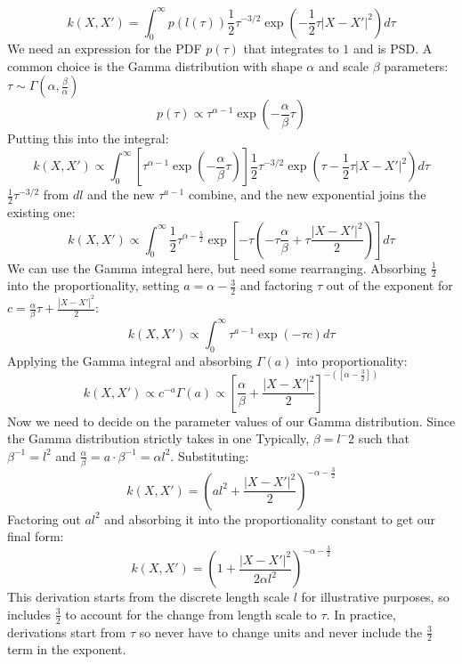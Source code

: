 \begin{equation*}
    k(X,X') = \int_{0}^{\infty} p(l(\tau)) \frac{1}{2} \tau^{-3/2} \exp \left( -\frac{1}{2} \tau |X - X'|^2 \right) d\tau
\end{equation*}
We need an expression for the PDF $p(\tau)$ that integrates to $1$ and is PSD. A common choice is the Gamma distribution with shape $\alpha$ and scale $\beta$ parameters: $\tau \sim \Gamma(\alpha, \frac{\beta}{\alpha})$ 
\begin{equation*}
    p(\tau) \propto \tau ^{\alpha - 1} \exp \left( - \frac{\alpha}{\beta} \tau \right)
\end{equation*}
Putting this into the integral:
\begin{equation*}
    k(X,X') \propto \int_{0}^{\infty}  \left[ \tau^{\alpha - 1} \exp \left(-\frac{\alpha}{\beta} \tau \right) \right] \frac{1}{2}\tau^{-3/2} \exp \left( \tau - \frac{1}{2} \tau |X - X'|^2 \right) d\tau
\end{equation*}
$\frac{1}{2}\tau^{-3/2}$ from $dl$ and the new $\tau^{a-1}$ combine, and the new exponential joins the existing one:
\begin{equation*}
    k(X,X') \propto \int_{0}^{\infty} \frac{1}{2} \tau^{\alpha - \frac{5}{2}} \exp \left[ -\tau \left( -\tau\frac{\alpha}{\beta} + \tau \frac{|X - X'|^2}{2} \right) \right] d\tau
\end{equation*}
We can use the Gamma integral here, but need some rearranging. Absorbing $\frac{1}{2}$ into the proportionality, setting $a = \alpha - \frac{3}{2}$ and factoring $\tau$ out of the exponent for $c = \frac{\alpha}{\beta}\tau + \frac{|X - X'|^2}{2}$:
\begin{equation*}
    k(X,X') \propto \int_{0}^{\infty} \tau^{a - 1} \exp ( -\tau c ) d\tau
\end{equation*}
Applying the Gamma integral and absorbing $\Gamma(a)$ into proportionality:
\begin{equation*}
    k(X,X') \propto c^{-a} \Gamma(a) \propto \left[ \frac{\alpha}{\beta} + \frac{|X - X'|^2}{2} \right]^{-\left( \left[ \alpha - \frac{3}{2} \right] \right)} 
\end{equation*}
Now we need to decide on the parameter values of our Gamma distribution. Since the Gamma distribution strictly takes in one Typically, $\beta = l^-2$ such that $\beta^{-1} = l^2$ and $\frac{\alpha}{\beta} = a \cdot \beta^{-1} = \alpha l^2$. Substituting:
\begin{equation*}
    k(X,X') = \left( al^2 + \frac{|X - X'|^2}{2} \right)^{-\alpha - \frac{3}{2}}
\end{equation*}
Factoring out $al^2$ and absorbing it into the proportionality constant to get our final form:
\begin{equation*}
    k(X,X') = \left( 1 + \frac{|X - X'|^2}{2\alpha l^2} \right)^{-\alpha - \frac{3}{2}}
\end{equation*}
This derivation starts from the discrete length scale $l$ for illustrative purposes, so includes $\frac{3}{2}$ to account for the change from length scale to $\tau$. In practice, derivations start from $\tau$ so never have to change units and never include the $\frac{3}{2}$ term in the exponent.

